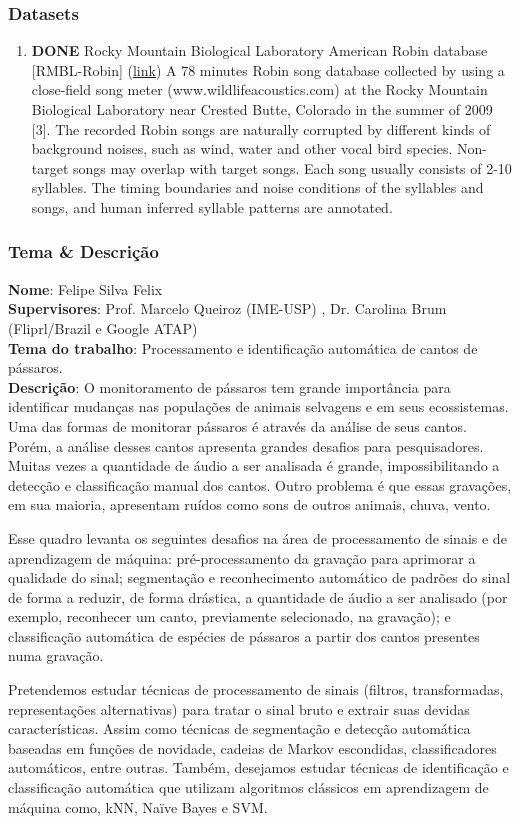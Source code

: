 \documentclass[11pt]{article}
\begin{document}
\subsubsection{Datasets}
\label{sec:orgc4222e1}
\begin{enumerate}
\item {\bfseries\sffamily DONE} Rocky Mountain Biological Laboratory American Robin database [RMBL-Robin] (\href{http://www.seas.ucla.edu/spapl/projects/Bird.html}{link})
\label{sec:orgfd51f1a}
A 78 minutes Robin song database collected by using a close-field song
meter (www.wildlifeacoustics.com) at the Rocky Mountain Biological
Laboratory near Crested Butte, Colorado in the summer of 2009 [3]. The
recorded Robin songs are naturally corrupted by different kinds of
background noises, such as wind, water and other vocal bird species.
Non-target songs may overlap with target songs. Each song usually consists
of 2-10 syllables. The timing boundaries and noise conditions of the
syllables and songs, and human inferred syllable patterns are annotated.
\end{enumerate}

\subsubsection{Tema \& Descrição}
\label{sec:orgff94e4f}
\textbf{Nome}: Felipe Silva Felix \\
\textbf{Supervisores}: Prof. Marcelo Queiroz (IME-USP) , Dr. Carolina Brum (Fliprl/Brazil e Google ATAP) \\
\textbf{Tema do trabalho}: Processamento e identificação automática de cantos de pássaros. \\

\textbf{Descrição}: O monitoramento de pássaros tem grande importância para identificar
mudanças nas populações de animais selvagens e em seus ecossistemas. Uma das
formas de monitorar pássaros é através da análise de seus cantos. Porém, a
análise desses cantos apresenta grandes desafios para pesquisadores. Muitas
vezes a quantidade de áudio a ser analisada é grande, impossibilitando a
detecção e classificação manual dos cantos. Outro problema é que essas
gravações, em sua maioria, apresentam ruídos como sons de outros animais, chuva,
vento.

Esse quadro levanta os seguintes desafios na área de processamento de sinais e
de aprendizagem de máquina: pré-processamento da gravação para aprimorar a
qualidade do sinal; segmentação e reconhecimento automático de padrões do sinal
de forma a reduzir, de forma drástica, a quantidade de áudio a ser analisado
(por exemplo, reconhecer um canto, previamente selecionado, na gravação); e
classificação automática de espécies de pássaros a partir dos cantos presentes
numa gravação.

Pretendemos estudar técnicas de processamento de sinais (filtros, transformadas,
representações alternativas) para tratar o sinal bruto e extrair suas devidas
características. Assim como técnicas de segmentação e detecção automática
baseadas em funções de novidade, cadeias de Markov escondidas, classificadores
automáticos, entre outras. Também, desejamos estudar técnicas de identificação e
classificação automática que utilizam algoritmos clássicos em aprendizagem de
máquina como, kNN, Naïve Bayes e SVM.
\end{document}
